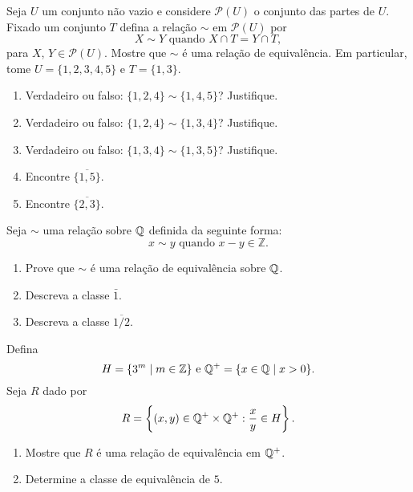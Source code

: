 \documentclass[12pt]{exam}
\begin{document}
    \vspace{.3cm}

    \questao{} Seja $U$ um conjunto não vazio e considere $\mathcal{P}(U)$ o conjunto das partes de $U$. Fixado um conjunto $T$ defina a relação $\sim$ em $\mathcal{P}(U)$ por
    \[
        X \sim Y \mbox{ quando } X \cap T = Y \cap T,
    \]
    para $X$, $Y \in \mathcal{P}(U)$. Mostre que $\sim$ é uma relação de equivalência. Em particular, tome $U = \{1,2,3,4,5\}$ e $T = \{1,3\}$.
    \begin{enumerate}[label={\alph*})]
        \item Verdadeiro ou falso: $\{1,2,4\} \sim \{1,4,5\}$? Justifique.

        \item Verdadeiro ou falso: $\{1,2,4\} \sim \{1,3,4\}$? Justifique.

        \item Verdadeiro ou falso: $\{1,3,4\} \sim \{1,3,5\}$? Justifique.

        \item Encontre $\overline{\{1,5\}}$.

        \item Encontre $\overline{\{2,3\}}$.

    \end{enumerate}

    \vspace{.3cm}

    \questao{} Seja $\sim$ uma rela{\c c}{\~a}o sobre $\mathbb{Q}$ definida da seguinte forma:
    \[
        x \sim y \mbox{ quando } x - y \in \mathbb{Z}.
    \]
    \begin{enumerate}[label={\alph*})]
        \item Prove que $\sim$ {\'e} uma rela{\c c}{\~a}o de equival{\^e}ncia sobre $\mathbb{Q}$.

        \item Descreva a classe $\bar{1}$.

        \item Descreva a classe $\overline{1/2}$.
    \end{enumerate}

    \vspace{.3cm}

    \questao{} Defina
    \[
        H = \{3^m \mid m \in \mathbb{Z}\} \mbox{ e } \mathbb{Q}^+ = \{x \in \mathbb{Q} \mid x > 0\}.
    \]
    Seja $R$ dado por
    \[
        R = \left\{(x,y) \in \mathbb{Q}^+\times \mathbb{Q}^+ : \frac{x}{y} \in H\right\}.
    \]
    \begin{enumerate}[label={\alph*})]
        \item Mostre que $R$ \'e uma rela\c{c}\~ao de equival\^encia em $\mathbb{Q}^+$.

        \item Determine a classe de equival\^encia de $5$.
    \end{enumerate}
\end{document}

